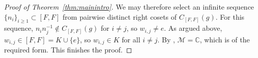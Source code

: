 \documentclass[11pt]{amsart}
\theoremstyle{definition}
\newcommand{\C}{\mathbb{C}}
\newcommand{\cM}{\mathcal{M}}
\begin{document}
\begin{proof}[Proof of Theorem~\ref{thm:mainintro}]
We may therefore select an infinite sequence $\{n_i\}_{i \ge 1} \subset [F,F]$ from pairwise distinct right cosets of $C_{[F,F]}(g)$. For this sequence, $n_i n_j^{-1} \notin C_{[F,F]}(g)$ for $i \neq j$, so $w_{i,j} \neq e$. As argued above, $w_{i,j} \in [F,F] = K \cup \{e\}$, so $w_{i,j} \in K$ for all $i \neq j$. By \cite[Lemma 3.6]{Amr26}, $\cM = \C $, which is of the required form. This finishes the proof.
\end{proof}


\end{document}
